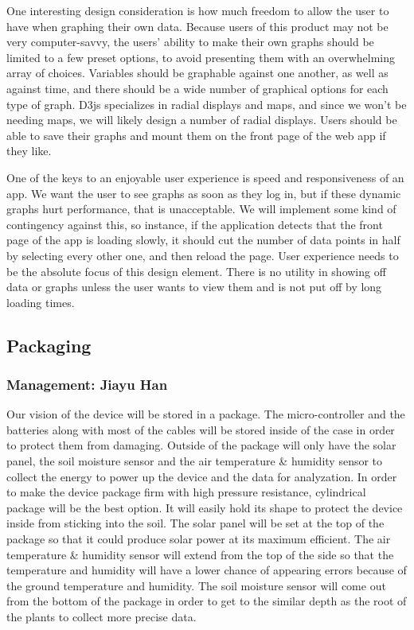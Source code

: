 \documentclass[IEEEtran,letterpaper,10pt,titlepage,fleqn,draftclsnofoot,onecolumn]{article}
\begin{document}
One interesting design consideration is how much freedom to allow the user to have when graphing their own data. Because users of this product may not be very computer-savvy, the users’ ability to make their own graphs should be limited to a few preset options, to avoid presenting them with an overwhelming array of choices. Variables should be graphable against one another, as well as against time, and there should be a wide number of graphical options for each type of graph. D3js specializes in radial displays and maps, and since we won’t be needing maps, we will likely design a number of radial displays. Users should be able to save their graphs and mount them on the front page of the web app if they like. 

One of the keys to an enjoyable user experience is speed and responsiveness of an app. We want the user to see graphs as soon as they log in, but if these dynamic graphs hurt performance, that is unacceptable. We will implement some kind of contingency against this, so instance, if the application detects that the front page of the app is loading slowly, it should cut the number of data points in half by selecting every other one, and then reload the page. User experience needs to be the absolute focus of this design element. There is no utility in showing off data or graphs unless the user wants to view them and is not put off by long loading times.

\subsection{Packaging}
\subsubsection{Management: Jiayu Han}

Our vision of the device will be stored in a package. The micro-controller and the batteries along with most of the cables will be stored inside of the case in order to protect them from damaging. Outside of the package will only have the solar panel, the soil moisture sensor and the air temperature \& humidity sensor to collect the energy to power up the device and the data for analyzation. In order to make the device package firm with high pressure resistance, cylindrical package will be the best option. It will easily hold its shape to protect the device inside from sticking into the soil. The solar panel will be set at the top of the package so that it could produce solar power at its maximum efficient. The air temperature \& humidity sensor will extend from the top of the side so that the temperature and humidity will have a lower chance of appearing errors because of the ground temperature and humidity. The soil moisture sensor will come out from the bottom of the package in order to get to the similar depth as the root of the plants to collect more precise data.
\end{document}
